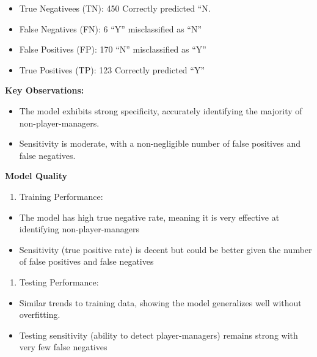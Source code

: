 \documentclass[
]{article}
\providecommand{\tightlist}{%
  \setlength{\itemsep}{0pt}\setlength{\parskip}{0pt}}
\begin{document}
\begin{itemize}
\item
  True Negativees (TN): 450 Correctly predicted ``N.
\item
  False Negatives (FN): 6 ``Y'' misclassified as ``N''
\item
  False Positives (FP): 170 ``N'' misclassified as ``Y''
\item
  True Positives (TP): 123 Correctly predicted ``Y''
\end{itemize}

\textbf{Key Observations:}

\begin{itemize}
\item
  The model exhibits strong specificity, accurately identifying the
  majority of non-player-managers.
\item
  Sensitivity is moderate, with a non-negligible number of false
  positives and false negatives.
\end{itemize}

\textbf{Model Quality}

\begin{enumerate}
\def\labelenumi{\arabic{enumi}.}
\tightlist
\item
  Training Performance:
\end{enumerate}

\begin{itemize}
\item
  The model has high true negative rate, meaning it is very effective at
  identifying non-player-managers
\item
  Sensitivity (true positive rate) is decent but could be better given
  the number of false positives and false negatives
\end{itemize}

\begin{enumerate}
\def\labelenumi{\arabic{enumi}.}
\setcounter{enumi}{1}
\tightlist
\item
  Testing Performance:
\end{enumerate}

\begin{itemize}
\item
  Similar trends to training data, showing the model generalizes well
  without overfitting.
\item
  Testing sensitivity (ability to detect player-managers) remains strong
  with very few false negatives
\end{itemize}
\end{document}
